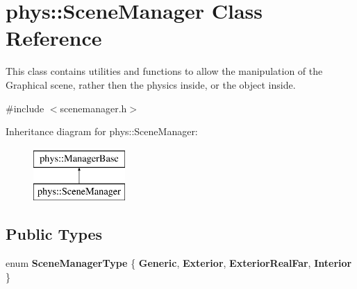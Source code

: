 \hypertarget{classphys_1_1SceneManager}{
\section{phys::SceneManager Class Reference}
\label{dd/da8/classphys_1_1SceneManager}
}


This class contains utilities and functions to allow the manipulation of the Graphical scene, rather then the physics inside, or the object inside.  




{\ttfamily \#include $<$scenemanager.h$>$}

Inheritance diagram for phys::SceneManager:\begin{figure}[H]
\begin{center}
\leavevmode
\includegraphics[height=2.000000cm]{dd/da8/classphys_1_1SceneManager}
\end{center}
\end{figure}
\subsection*{Public Types}
\begin{DoxyCompactItemize}
\item 
enum {\bfseries SceneManagerType} \{ {\bfseries Generic}, 
{\bfseries Exterior}, 
{\bfseries ExteriorRealFar}, 
{\bfseries Interior}
 \}
\end{DoxyCompactItemize}
